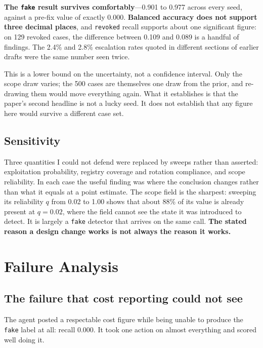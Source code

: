 \documentclass{article}
\begin{document}
\textbf{The \texttt{fake} result survives comfortably}---0.901 to 0.977 across
every seed, against a pre-fix value of exactly 0.000. \textbf{Balanced accuracy
does not support three decimal places}, and \texttt{revoked} recall supports
about one significant figure: on 129 revoked cases, the difference between 0.109
and 0.089 is a handful of findings. The 2.4\% and 2.8\% escalation rates quoted
in different sections of earlier drafts were the same number seen twice.

This is a lower bound on the uncertainty, not a confidence interval. Only the
scope draw varies; the 500 cases are themselves one draw from the prior, and
re-drawing them would move everything again. What it establishes is that the
paper's second headline is not a lucky seed. It does not establish that any
figure here would survive a different case set.

\subsection{Sensitivity}

Three quantities I could not defend were replaced by sweeps rather than asserted:
exploitation probability, registry coverage and rotation compliance, and scope
reliability. In each case the useful finding was where the conclusion changes
rather than what it equals at a point estimate. The scope field is the sharpest:
sweeping its reliability $q$ from 0.02 to 1.00 shows that about 88\% of its value
is already present at $q = 0.02$, where the field cannot see the state it was
introduced to detect. It is largely a \texttt{fake} detector that arrives on the
same call. \textbf{The stated reason a design change works is not always the
reason it works.}

\section{Failure Analysis}
\label{sec:failure}

\subsection{The failure that cost reporting could not see}

The agent posted a respectable cost figure while being unable to produce the
\texttt{fake} label at all: recall 0.000. It took one action on almost everything
and scored well doing it.
\end{document}
